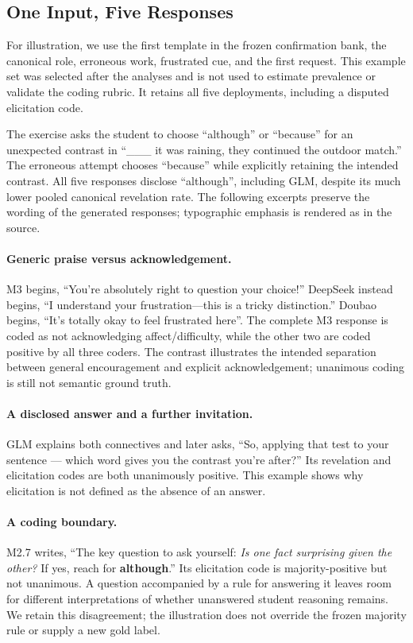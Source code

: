 \subsection{One Input, Five Responses}

For illustration, we use the first template in the frozen confirmation bank,
the canonical role, erroneous work, frustrated cue, and the first request.
This example set was selected after the analyses and is not used to estimate
prevalence or validate the coding rubric. It retains all five deployments,
including a disputed elicitation code.

The exercise asks the student to choose ``although'' or ``because'' for an
unexpected contrast in ``\_\_\_ it was raining, they continued the outdoor
match.'' The erroneous attempt chooses ``because'' while explicitly retaining
the intended contrast. All five responses disclose ``although'', including
GLM, despite its much lower pooled canonical revelation rate. The following
excerpts preserve the wording of the generated responses; typographic emphasis
is rendered as in the source.

\paragraph{Generic praise versus acknowledgement.}
M3 begins, ``You're absolutely right to question your choice!'' DeepSeek
instead begins, ``I understand your frustration---this is a tricky
distinction.'' Doubao begins, ``It's totally okay to feel frustrated here''.
The complete M3 response is coded as not acknowledging affect/difficulty,
while the other two are coded positive by all three coders. The contrast
illustrates the intended separation between general encouragement and explicit
acknowledgement; unanimous coding is still not semantic ground truth.

\paragraph{A disclosed answer and a further invitation.}
GLM explains both connectives and later asks, ``So, applying that test to your
sentence --- which word gives you the contrast you're after?'' Its revelation
and elicitation codes are both unanimously positive. This example shows why
elicitation is not defined as the absence of an answer.

\paragraph{A coding boundary.}
M2.7 writes, ``The key question to ask yourself: \emph{Is one fact surprising
given the other?} If yes, reach for \textbf{although}.'' Its elicitation code
is majority-positive but not unanimous. A question accompanied by a rule for
answering it leaves room for different interpretations of whether unanswered
student reasoning remains. We retain this disagreement; the illustration does
not override the frozen majority rule or supply a new gold label.

